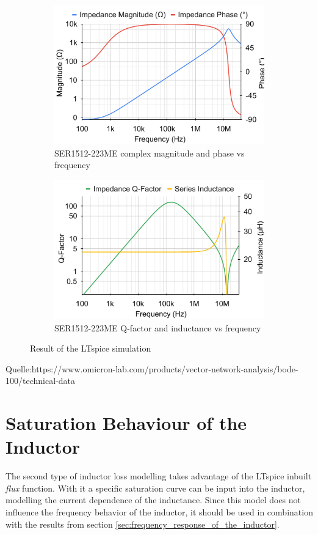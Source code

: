 \begin{figure}[H]
   \begin{subfigure}[b]{0.50\textwidth}
       \includegraphics[width=\textwidth]{Bilder/Kapitel3/SER223_BodePlot_Spice.pdf}
       \caption{SER1512-223ME complex magnitude and phase vs frequency}
   \end{subfigure}
   \begin{subfigure}[b]{0.50\textwidth}
       \includegraphics[width=\textwidth]{Bilder/Kapitel3/SER223_QLPlot_Spice.pdf}
       \caption{SER1512-223ME Q-factor and inductance vs frequency}
   \end{subfigure}
   \caption{Result of the LTspice simulation}
   \label{fig:LTspice_Frequency_Response}
\end{figure}

Quelle:https://www.omicron-lab.com/products/vector-network-analysis/bode-100/technical-data
\newpage
\section{Saturation Behaviour of the Inductor}\label{sec:saturation_behaviour_of_the_inductor}
The second type of inductor loss modelling takes advantage of the LTspice inbuilt \textit{flux} function. With it a  specific saturation curve can be input into the inductor, modelling the current dependence of the inductance. Since this model does not influence the frequency behavior of the inductor, it should be used in combination with the results from section \ref{sec:frequency_response_of_the_inductor}. \\
